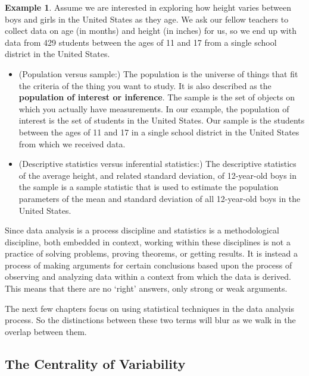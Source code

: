 \documentclass[
]{book}
\theoremstyle{definition}
\theoremstyle{definition}
\newtheorem{example}{Example}[chapter]
\theoremstyle{definition}
\theoremstyle{definition}
\theoremstyle{remark}
\begin{document}
\begin{example}

Assume we are interested in exploring how height varies between boys and girls in the United States as they age. We ask our fellow teachers to collect data on age (in months) and height (in inches) for us, so we end up with data from 429 students between the ages of 11 and 17 from a single school district in the United States.

\begin{itemize}
\item
  (Population versus sample:) The population is the universe of things that fit the criteria of the thing you want to study. It is also described as the \textbf{population of interest or inference}. The sample is the set of objects on which you actually have measurements. In our example, the population of interest is the set of students in the United States. Our sample is the students between the ages of 11 and 17 in a single school district in the United States from which we received data.
\item
  (Descriptive statistics versus inferential statistics:) The descriptive statistics of the average height, and related standard deviation, of 12-year-old boys in the sample is a sample statistic that is used to estimate the population parameters of the mean and standard deviation of all 12-year-old boys in the United States.
\end{itemize}

\end{example}

Since data analysis is a process discipline and statistics is a methodological discipline, both embedded in context, working within these disciplines is not a practice of solving problems, proving theorems, or getting results. It is instead a process of making arguments for certain conclusions based upon the process of observing and analyzing data within a context from which the data is derived. This means that there are no `right' answers, only strong or weak arguments.

The next few chapters focus on using statistical techniques in the data analysis process. So the distinctions between these two terms will blur as we walk in the overlap between them.

\hypertarget{the-centrality-of-variability}{%
\subsection{The Centrality of Variability}\label{the-centrality-of-variability}}
\end{document}
